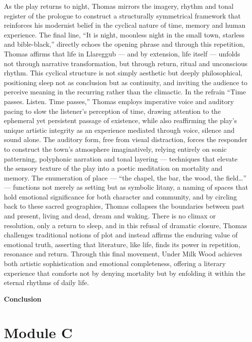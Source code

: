 		As the play returns to night, Thomas mirrors the imagery, rhythm and tonal register of the prologue to construct a structurally symmetrical framework that reinforces his modernist belief in the cyclical nature of time, memory and human experience. The final line, “It is night, moonless night in the small town, starless and bible-black,” directly echoes the opening phrase and through this repetition, Thomas affirms that life in Llareggub — and by extension, life itself — unfolds not through narrative transformation, but through return, ritual and unconscious rhythm. This cyclical structure is not simply aesthetic but deeply philosophical, positioning sleep not as conclusion but as continuity, and inviting the audience to perceive meaning in the recurring rather than the climactic. In the refrain “Time passes. Listen. Time passes,” Thomas employs imperative voice and auditory pacing to slow the listener’s perception of time, drawing attention to the ephemeral yet persistent passage of existence, while also reaffirming the play’s unique artistic integrity as an experience mediated through voice, silence and sound alone. The auditory form, free from visual distraction, forces the responder to construct the town’s atmosphere imaginatively, relying entirely on sonic patterning, polyphonic narration and tonal layering — techniques that elevate the sensory texture of the play into a poetic meditation on mortality and memory. The enumeration of place — “the chapel, the bar, the wood, the field…” — functions not merely as setting but as symbolic litany, a naming of spaces that hold emotional significance for both character and community, and by circling back to these sacred geographies, Thomas collapses the boundaries between past and present, living and dead, dream and waking. There is no climax or resolution, only a return to sleep, and in this refusal of dramatic closure, Thomas challenges traditional notions of plot and instead affirms the enduring value of emotional truth, asserting that literature, like life, finds its power in repetition, resonance and return. Through this final movement, Under Milk Wood achieves both artistic sophistication and emotional completeness, offering a literary experience that comforts not by denying mortality but by enfolding it within the eternal rhythms of daily life.

	\textbf{Conclusion}

\newpage

\section{Module C}

